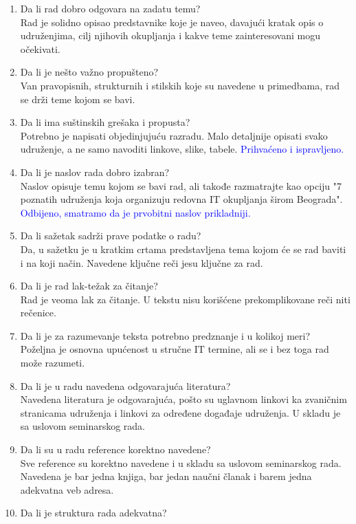 \documentclass[a4paper]{report}
\newcommand{\odgovor}[1]{\textcolor{blue}{#1}}
\begin{document}
\begin{enumerate}
\item Da li rad dobro odgovara na zadatu temu?\\
Rad je solidno opisao predstavnike koje je naveo, davajući kratak opis o udruženjima,
cilj njihovih okupljanja i kakve teme zainteresovani mogu očekivati. 
\item Da li je nešto važno propušteno?\\
Van pravopisnih, strukturnih i stilskih koje su navedene u primedbama, 
rad se drži teme kojom se bavi.
\item Da li ima suštinskih grešaka i propusta?\\
Potrebno je napisati objedinjujuću razradu. Malo detaljnije opisati 
svako udruženje, a ne samo navoditi linkove, slike, tabele.
\odgovor{Prihvaćeno i ispravljeno.}
\item Da li je naslov rada dobro izabran?\\
Naslov opisuje temu kojom se bavi rad, ali takođe razmatrajte kao 
opciju "7 poznatih udruženja koja organizuju redovna IT
okupljanja širom Beograda".
\odgovor{Odbijeno, smatramo da je prvobitni naslov prikladniji.}
\item Da li sažetak sadrži prave podatke o radu?\\
Da, u sažetku je u kratkim crtama predstavljena tema kojom će se
rad baviti i na koji način. Navedene ključne reči jesu ključne za rad.
\item Da li je rad lak-težak za čitanje?\\
Rad je veoma lak za čitanje. U tekstu nisu korišćene prekomplikovane reči niti rečenice.
\item Da li je za razumevanje teksta potrebno predznanje i u kolikoj meri?\\
Poželjna je osnovna upućenost u stručne IT termine, ali se i bez toga rad može razumeti.
\item Da li je u radu navedena odgovarajuća literatura?\\
Navedena literatura je odgovarajuća, pošto su uglavnom linkovi ka zvaničnim stranicama
udruženja i linkovi za određene događaje udruženja. U skladu je sa uslovom seminarskog rada. 
\item Da li su u radu reference korektno navedene?\\
Sve reference su korektno navedene i u skladu sa uslovom seminarskog rada.
Navedena je bar jedna knjiga, bar jedan naučni članak i barem jedna adekvatna veb adresa.
\item Da li je struktura rada adekvatna?\\

\end{enumerate}
\end{document}

